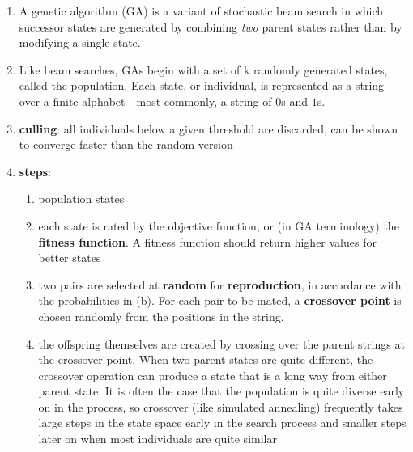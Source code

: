 \begin{enumerate}
    \item A genetic algorithm (GA) is a variant of stochastic beam search in which successor states are generated by combining \textit{two} parent states rather than by modifying a single state.
    \hfill \cite{ai/book/Artificial-Intelligence-A-Modern-Approach/Russell-Norvig}

    \item Like beam searches, GAs begin with a set of k randomly generated states, called the population. 
    Each state, or individual, is represented as a string over a finite alphabet—most commonly, a string of $0$s and $1$s.
    \hfill \cite{ai/book/Artificial-Intelligence-A-Modern-Approach/Russell-Norvig}

    \item \textbf{culling}: all individuals below a given threshold are discarded, can be shown to converge faster than the random version
    \hfill \cite{ai/book/Artificial-Intelligence-A-Modern-Approach/Russell-Norvig}

    \item \textbf{steps}:
    \begin{enumerate}
        \item population states
        \hfill \cite{ai/book/Artificial-Intelligence-A-Modern-Approach/Russell-Norvig}

        \item each state is rated by the objective function, or (in GA terminology) the \textbf{fitness function}.
        A fitness function should return higher values for better states
        \hfill \cite{ai/book/Artificial-Intelligence-A-Modern-Approach/Russell-Norvig}

        \item two pairs are selected at \textbf{random} for \textbf{reproduction}, in accordance with the probabilities in (b).
        For each pair to be mated, a \textbf{crossover point} is chosen randomly from the positions in the string.
        \hfill \cite{ai/book/Artificial-Intelligence-A-Modern-Approach/Russell-Norvig}

        \item the offspring themselves are created by crossing over the parent strings at the crossover point.
        When two parent states are quite different, the crossover operation can produce a state that is a long way from either parent state. 
        It is often the case that the population is quite diverse early on in the process, so crossover (like simulated annealing) frequently takes large steps in the state space early in the search process and smaller steps later on when most individuals are quite similar
        \hfill \cite{ai/book/Artificial-Intelligence-A-Modern-Approach/Russell-Norvig}


\end{enumerate}
\end{enumerate}
